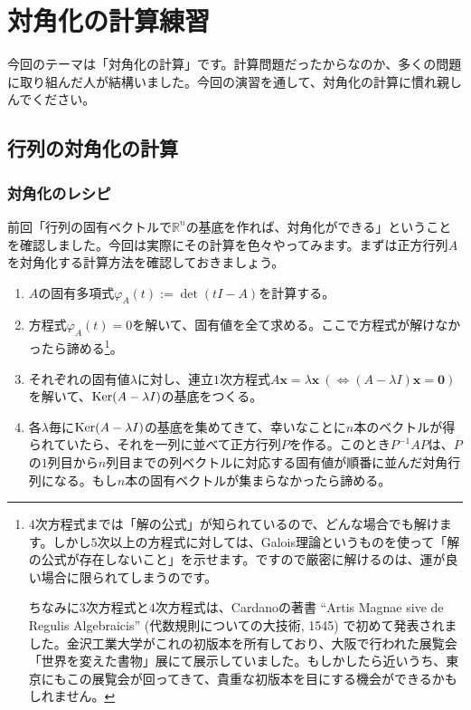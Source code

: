 \chapter{対角化の計算練習}

今回のテーマは「対角化の計算」です。計算問題だったからなのか、多くの問題に取り組んだ人が結構いました。今回の演習を通して、対角化の計算に慣れ親しんでください。

\section{行列の対角化の計算}

\subsection{対角化のレシピ}

前回「行列の固有ベクトルで$\mathbb{R}^n$の基底を作れば、対角化ができる」ということを確認しました。今回は実際にその計算を色々やってみます。まずは正方行列$A$を対角化する計算方法を確認しておきましょう。

\begin{enumerate}
\item $A$の固有多項式$\varphi_A(t) := \det(tI - A)$を計算する。
\item 方程式$\varphi_A(t) = 0$を解いて、固有値を全て求める。ここで方程式が解けなかったら諦める\footnote{$4$次方程式までは「解の公式」が知られているので、どんな場合でも解けます。しかし$5$次以上の方程式に対しては、Galois理論というものを使って「解の公式が存在しないこと」を示せます。ですので厳密に解けるのは、運が良い場合に限られてしまうのです。

ちなみに$3$次方程式と$4$次方程式は、Cardanoの著書 ``Artis Magnae sive de Regulis Algebraicis'' (代数規則についての大技術, 1545) で初めて発表されました。金沢工業大学がこれの初版本を所有しており、大阪で行われた展覧会「世界を変えた書物」展にて展示していました。もしかしたら近いうち、東京にもこの展覧会が回ってきて、貴重な初版本を目にする機会ができるかもしれません。}。
\item それぞれの固有値$\lambda$に対し、連立$1$次方程式$A \bm{x} = \lambda\bm{x}\ (\Leftrightarrow (A - \lambda I)\bm{x} = \bm{0})$を解いて、$\operatorname{Ker} (A - \lambda I)$の基底をつくる。
\item 各$\lambda$毎に$\operatorname{Ker} (A - \lambda I)$の基底を集めてきて、幸いなことに$n$本のベクトルが得られていたら、それを一列に並べて正方行列$P$を作る。このとき$P^{-1} A P$は、$P$の$1$列目から$n$列目までの列ベクトルに対応する固有値が順番に並んだ対角行列になる。もし$n$本の固有ベクトルが集まらなかったら諦める。
\end{enumerate}

